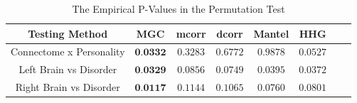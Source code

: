 \documentclass[11pt]{article}
\begin{document}


\begin{table}[!t]
\footnotesize
\renewcommand{\arraystretch}{0.5}
\centering
{\begin{tabular}{|c||c|c|c|c|c|c|c|}
\hline
Testing Method & MGC & mcorr & dcorr & Mantel & HHG \\
\hline
Connectome x Personality & $\textbf{0.0332}$ & $0.3283$ & $0.6772$ & $0.9878$  & $0.0527$ \\
\hline
Left Brain vs Disorder  & $\textbf{0.0329}$ & $0.0856$ & $0.0749$ & $0.0395$ & $0.0372$ \\
\hline
Right Brain vs Disorder & $\textbf{0.0117}$ & $0.1144$ & $0.1065$  & $0.0760$ & $0.0801$\\
\hline
\end{tabular}
\caption{The Empirical P-Values in the Permutation Test}
\label{table1}
}
\end{table}
\end{document}
